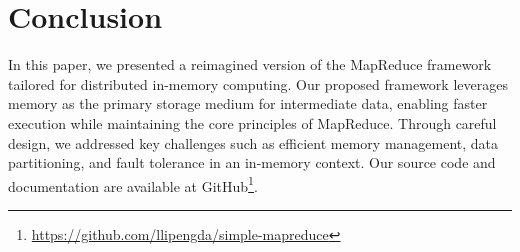 \section{Conclusion}
\label{sec:conclusion}

In this paper, we presented a reimagined version of the MapReduce framework tailored for distributed in-memory computing. Our proposed framework leverages memory as the primary storage medium for intermediate data, enabling faster execution while maintaining the core principles of MapReduce. Through careful design, we addressed key challenges such as efficient memory management, data partitioning, and fault tolerance in an in-memory context. Our source code and documentation are available at GitHub\footnote{\url{https://github.com/llipengda/simple-mapreduce}}.